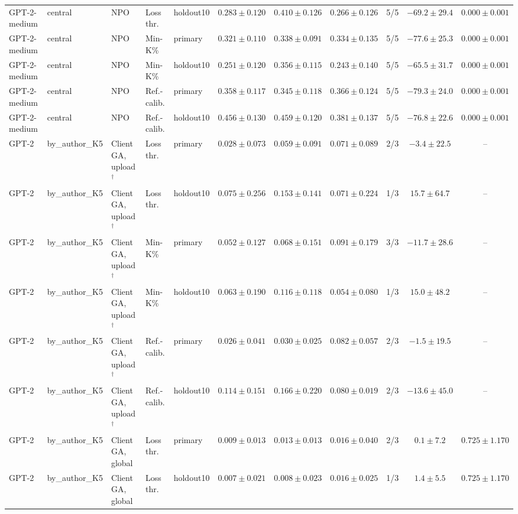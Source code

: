 \begin{table}[t]
\begin{tabular*}{\textwidth}{@{\extracolsep{\fill}}lllllcccccc@{}}
GPT-2-medium & central & NPO & Loss thr. & holdout10 & $0.283 \pm 0.120$ & $0.410 \pm 0.126$ & $0.266 \pm 0.126$ & 5/5 & $-69.2 \pm 29.4$ & $0.000 \pm 0.001$ \\
GPT-2-medium & central & NPO & Min-K\% & primary & $0.321 \pm 0.110$ & $0.338 \pm 0.091$ & $0.334 \pm 0.135$ & 5/5 & $-77.6 \pm 25.3$ & $0.000 \pm 0.001$ \\
GPT-2-medium & central & NPO & Min-K\% & holdout10 & $0.251 \pm 0.120$ & $0.356 \pm 0.115$ & $0.243 \pm 0.140$ & 5/5 & $-65.5 \pm 31.7$ & $0.000 \pm 0.001$ \\
GPT-2-medium & central & NPO & Ref.-calib. & primary & $0.358 \pm 0.117$ & $0.345 \pm 0.118$ & $0.366 \pm 0.124$ & 5/5 & $-79.3 \pm 24.0$ & $0.000 \pm 0.001$ \\
GPT-2-medium & central & NPO & Ref.-calib. & holdout10 & $0.456 \pm 0.130$ & $0.459 \pm 0.120$ & $0.381 \pm 0.137$ & 5/5 & $-76.8 \pm 22.6$ & $0.000 \pm 0.001$ \\
GPT-2 & by\_author\_K5 & Client GA, upload$^{\dagger}$ & Loss thr. & primary & $0.028 \pm 0.073$ & $0.059 \pm 0.091$ & $0.071 \pm 0.089$ & 2/3 & $-3.4 \pm 22.5$ & -- \\
GPT-2 & by\_author\_K5 & Client GA, upload$^{\dagger}$ & Loss thr. & holdout10 & $0.075 \pm 0.256$ & $0.153 \pm 0.141$ & $0.071 \pm 0.224$ & 1/3 & $15.7 \pm 64.7$ & -- \\
GPT-2 & by\_author\_K5 & Client GA, upload$^{\dagger}$ & Min-K\% & primary & $0.052 \pm 0.127$ & $0.068 \pm 0.151$ & $0.091 \pm 0.179$ & 3/3 & $-11.7 \pm 28.6$ & -- \\
GPT-2 & by\_author\_K5 & Client GA, upload$^{\dagger}$ & Min-K\% & holdout10 & $0.063 \pm 0.190$ & $0.116 \pm 0.118$ & $0.054 \pm 0.080$ & 1/3 & $15.0 \pm 48.2$ & -- \\
GPT-2 & by\_author\_K5 & Client GA, upload$^{\dagger}$ & Ref.-calib. & primary & $0.026 \pm 0.041$ & $0.030 \pm 0.025$ & $0.082 \pm 0.057$ & 2/3 & $-1.5 \pm 19.5$ & -- \\
GPT-2 & by\_author\_K5 & Client GA, upload$^{\dagger}$ & Ref.-calib. & holdout10 & $0.114 \pm 0.151$ & $0.166 \pm 0.220$ & $0.080 \pm 0.019$ & 2/3 & $-13.6 \pm 45.0$ & -- \\
GPT-2 & by\_author\_K5 & Client GA, global & Loss thr. & primary & $0.009 \pm 0.013$ & $0.013 \pm 0.013$ & $0.016 \pm 0.040$ & 2/3 & $0.1 \pm 7.2$ & $0.725 \pm 1.170$ \\
GPT-2 & by\_author\_K5 & Client GA, global & Loss thr. & holdout10 & $0.007 \pm 0.021$ & $0.008 \pm 0.023$ & $0.016 \pm 0.025$ & 1/3 & $1.4 \pm 5.5$ & $0.725 \pm 1.170$ \\

\end{tabular*}
\end{table}

